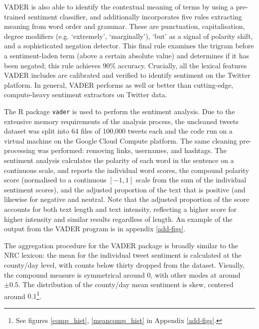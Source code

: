 \documentclass[12pt,a4]{article}
\begin{document}
VADER is also able to identify the contextual meaning of terms by using a pre-trained sentiment classifier, and additionally incorporates five rules extracting meaning from word order and grammar. These are punctuation, capitalisation, degree modifiers (e.g. `extremely', `marginally'), `but' as a signal of polarity shift, and a sophisticated negation detector. This final rule examines the trigram before a sentiment-laden term (above a certain absolute value) and determines if it has been negated; this rule achieves 90\% accuracy. Crucially, all the lexical features VADER includes are calibrated and verified to identify sentiment on the Twitter platform. In general, VADER performs as well or better than cutting-edge, compute-heavy sentiment extractors on Twitter data. 

The R package \texttt{vader} \parencite{roehrickVaderValenceAware2020} is used to perform the sentiment analysis. Due to the extensive memory requirements of the analysis process, the uncleaned tweets dataset was split into 64 files of 100,000 tweets each and the code run on a virtual machine on the Google Cloud Compute platform. The same cleaning pre-processing was performed: removing links, usernames, and hashtags. The sentiment analysis calculates the polarity of each word in the sentence on a continuous scale, and reports the  individual word scores, the compound polarity score (normalised to a continuous \([-1,1]\) scale from the sum of the individual sentiment scores), and the adjusted proportion of the text that is positive (and likewise for negative and neutral. Note that the adjusted proportion of the score accounts for both text length and text intensity, reflecting a higher score for higher intensity and similar results regardless of length. An example of the output from the VADER program is in appendix \ref{add-figs}.

The aggregation procedure for the VADER package is broadly similar to the NRC lexicon: the mean for the individual tweet sentiment is calculated at the county/day level, with counts below thirty dropped from the dataset. Visually, the compound measure is symmetrical around 0, with other modes at around \(\pm 0.5\). The distribution of the county/day mean sentiment is skew, centered around \(0.1\)\footnote{See figures \ref{comp_hist}, \ref{meancomp_hist} in Appendix \ref{add-figs}.}.
\end{document}
